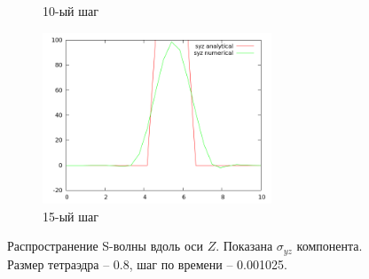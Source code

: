 \begin{figure}[H]
\begin{subfigure}[b]{0.5\textwidth}
\caption{10-ый шаг}
\end{subfigure}
\begin{subfigure}[b]{0.5\textwidth}
\centering
\includegraphics[width=0.75\textwidth]{png/veryfication/0.8/s-wave-along-z15.png}
\caption{15-ый шаг}
\end{subfigure}
\caption{Распространение S-волны вдоль оси $Z$. Показана $\sigma_{yz}$ компонента. Размер тетраэдра -- 0.8, шаг по времени -- 0.001025. }
\label{pic:s_wave_along_z8}
\end{figure}

